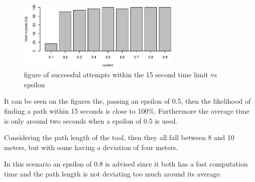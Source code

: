 \documentclass[12pt,a4paper]{article}
\begin{document}
\begin{figure}[H]
\centering
\includegraphics[width=0.7\textwidth]{../statistics/successfulVSepsilon}
\caption{figure of successful attempts within the 15 second time limit vs epsilon}
\label{fig:successfulVSepsilon}
\end{figure}

It can be seen on the figures the, passing an epsilon of 0.5, then the likelihood of finding a path within 15 seconds is close to 100\%.
Furthermore the average time is only around two seconds when a epsilon of 0.5 is used.

Considering the path length of the tool, then they all fall between 8 and 10 meters, but with some having a deviation of four meters.

In this scenario an epsilon of 0.8 is advised since it both has a fast computation time and the path length is not deviating too much around its average.
\end{document}
